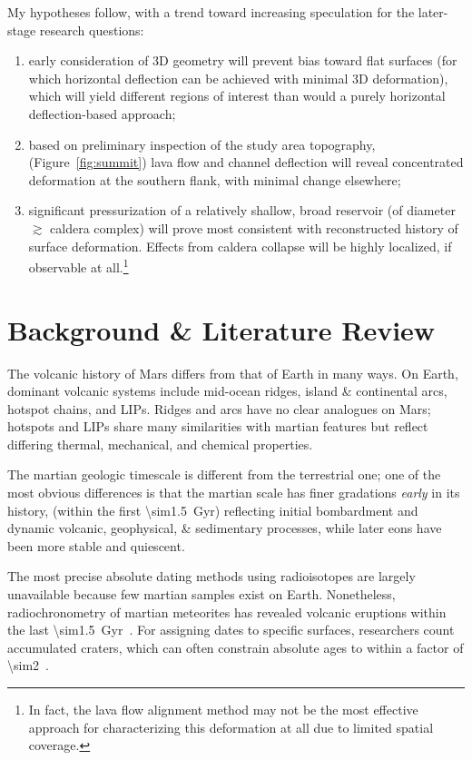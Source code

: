My hypotheses follow, with a trend toward increasing speculation for the later-stage research questions:\begin{enumerate}
    \item early consideration of 3D geometry will prevent bias toward flat surfaces (for which horizontal deflection can be achieved with minimal 3D deformation), which will yield different regions of interest than would a purely horizontal deflection-based approach;
    \item based on preliminary inspection of the study area topography, (Figure~\ref{fig:summit}) lava flow and channel deflection will reveal concentrated deformation at the southern flank, with minimal change elsewhere;
    \item significant pressurization of a relatively shallow, broad reservoir (of diameter $\gtrsim$ caldera complex) will prove most consistent with reconstructed history of surface deformation. Effects from caldera collapse will be highly localized, if observable at all.\footnote{In fact, the lava flow alignment method may not be the most effective approach for characterizing this deformation at all due to limited spatial coverage.}
\end{enumerate}

\section{Background \& Literature Review}

The volcanic history of Mars differs from that of Earth in many ways. On Earth, dominant volcanic systems include mid-ocean ridges, island \& continental arcs, hotspot chains, and \acp{LIP}. Ridges and arcs have no clear analogues on Mars; hotspots and \acp{LIP} share many similarities with martian features but reflect differing thermal, mechanical, and chemical properties.

The martian geologic timescale is different from the terrestrial one; one of the most obvious differences is that the martian scale has finer gradations \textit{early} in its history, (within the first \qty{\sim1.5}{Gyr}) reflecting initial bombardment and dynamic volcanic, geophysical, \& sedimentary processes, while later eons have been more stable and quiescent.

The most precise absolute dating methods using radioisotopes are largely unavailable because few martian samples exist on Earth. Nonetheless, radiochronometry of martian meteorites has revealed volcanic eruptions within the last \qty{\sim1.5}{Gyr}~\parencite[e.g.,][]{cohen_taking_2017}. For assigning dates to specific surfaces, researchers count accumulated craters, which can often constrain absolute ages to within a factor of \num{\sim2}~\parencite{kneissl_map-projection-independent_2011}.

